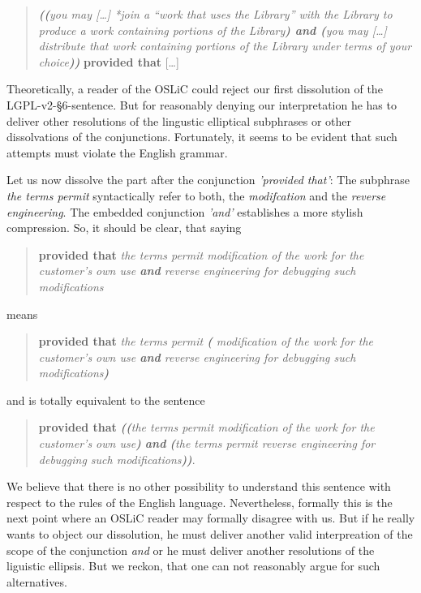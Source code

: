 \begin{quote}\noindent\emph{\textbf{((}you may [\ldots] \emph{*join} a
\enquote{work that uses the Library} with the Library to produce a work
containing portions of the Library\textbf{) and (}you may [\ldots] distribute
that work containing portions of the Library under terms of your
choice\textbf{))}} \textbf{provided that} [\ldots]\end{quote}

Theoretically, a reader of the OSLiC could reject our first dissolution of the
LGPL-v2-§6-sentence. But for reasonably denying our interpretation he has to
deliver other resolutions of the lingustic elliptical subphrases or other
dissolvations of the conjunctions. Fortunately, it seems to be evident that such
attempts must violate the English grammar.

Let us now dissolve the part after the conjunction \emph{'provided that'}: The
subphrase \emph{the terms permit} syntactically refer to both, the
\emph{modifcation} and the \emph{reverse engineering}. The embedded conjunction
\emph{'and'} establishes a more stylish compression. So, it should be clear,
that saying

\begin{quote}\noindent\textbf{provided that} \emph{the terms permit modification
of the work for the customer's own use \emph{\textbf{and}} reverse engineering
for debugging such modifications}\end{quote}

means

\begin{quote}\noindent\textbf{provided that} \emph{the terms permit
\textbf{(} modification of the work for the customer's own use \emph{\textbf{and}}
reverse engineering for debugging such modifications\textbf{)}}\end{quote}

and is totally equivalent to the sentence 

\begin{quote}\noindent[\ldots] \textbf{provided that} \emph{\textbf{((}the terms
permit modification of the work for the customer's own use\textbf{)}
\emph{\textbf{and}} \textbf{(}the terms permit reverse engineering for debugging
such modifications\textbf{))}}.
\end{quote}

We believe that there is no other possibility to understand this sentence with
respect to the rules of the English language. Nevertheless, formally this is the
next point where an OSLiC reader may formally disagree with us. But if he really
wants to object our dissolution, he must deliver another valid interpreation of
the scope of the conjunction \emph{and} or he must deliver another resolutions
of the liguistic ellipsis. But we reckon, that one can not reasonably argue for
such alternatives.

